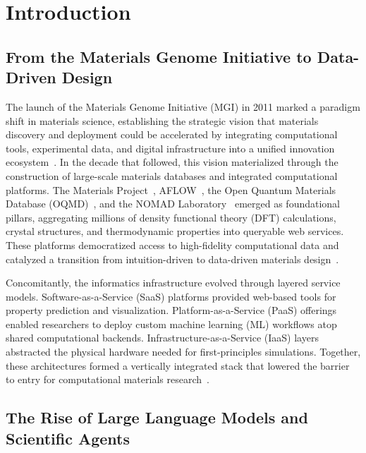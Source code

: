\documentclass{article}
\begin{document}

\section{Introduction}
\label{sec:intro}

\subsection{From the Materials Genome Initiative to Data-Driven Design}

The launch of the Materials Genome Initiative (MGI) in 2011 marked a paradigm shift in materials science, establishing the strategic vision that materials discovery and deployment could be accelerated by integrating computational tools, experimental data, and digital infrastructure into a unified innovation ecosystem~\cite{mgi2011}. In the decade that followed, this vision materialized through the construction of large-scale materials databases and integrated computational platforms. The Materials Project~\cite{jain2013,horton2025natmat}, AFLOW~\cite{curtarolo2012}, the Open Quantum Materials Database (OQMD)~\cite{kirklin2015}, and the NOMAD Laboratory~\cite{draxl2019} emerged as foundational pillars, aggregating millions of density functional theory (DFT) calculations, crystal structures, and thermodynamic properties into queryable web services. These platforms democratized access to high-fidelity computational data and catalyzed a transition from intuition-driven to data-driven materials design~\cite{tshitoyan2019,merchant2023}.

Concomitantly, the informatics infrastructure evolved through layered service models. Software-as-a-Service (SaaS) platforms provided web-based tools for property prediction and visualization. Platform-as-a-Service (PaaS) offerings enabled researchers to deploy custom machine learning (ML) workflows atop shared computational backends. Infrastructure-as-a-Service (IaaS) layers abstracted the physical hardware needed for first-principles simulations. Together, these architectures formed a vertically integrated stack that lowered the barrier to entry for computational materials research~\cite{saal2020,ramakrishna2019}.

\subsection{The Rise of Large Language Models and Scientific Agents}
\end{document}
